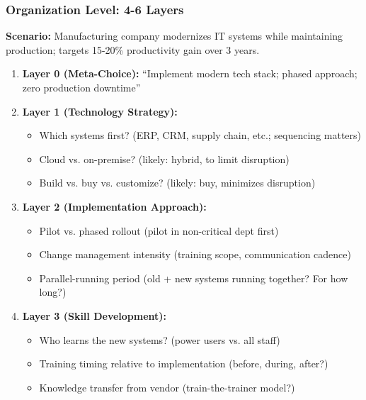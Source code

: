 \documentclass[11pt, a4paper]{article}
\begin{document}
\subsubsection{Organization Level: 4-6 Layers}

\begin{tcolorbox}[colback=gray!5!white, colframe=gray!75!black, title=Example: Digital Modernization (Incremental Implementation)]

\textbf{Scenario:} Manufacturing company modernizes IT systems while maintaining production; targets 15-20\% productivity gain over 3 years.

\begin{enumerate}
    \item \textbf{Layer 0 (Meta-Choice):} ``Implement modern tech stack; phased approach; zero production downtime''

    \item \textbf{Layer 1 (Technology Strategy):}
    \begin{itemize}[nosep]
        \item Which systems first? (ERP, CRM, supply chain, etc.; sequencing matters)
        \item Cloud vs. on-premise? (likely: hybrid, to limit disruption)
        \item Build vs. buy vs. customize? (likely: buy, minimizes disruption)
    \end{itemize}

    \item \textbf{Layer 2 (Implementation Approach):}
    \begin{itemize}[nosep]
        \item Pilot vs. phased rollout (pilot in non-critical dept first)
        \item Change management intensity (training scope, communication cadence)
        \item Parallel-running period (old + new systems running together? For how long?)
    \end{itemize}

    \item \textbf{Layer 3 (Skill Development):}
    \begin{itemize}[nosep]
        \item Who learns the new systems? (power users vs. all staff)
        \item Training timing relative to implementation (before, during, after?)
        \item Knowledge transfer from vendor (train-the-trainer model?)
    \end{itemize}


\end{enumerate}
\end{tcolorbox}
\end{document}
